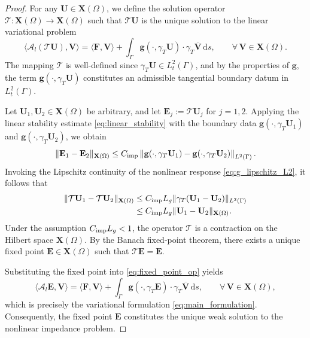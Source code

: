 \documentclass[12pt,reqno]{amsart}
\theoremstyle{definition}
\numberwithin{equation}{section}
\begin{document}
\begin{proof}
For any $\mathbf{U} \in \mathbf{X}(\Omega)$, we define the solution operator $\mathcal{T} \colon \mathbf{X}(\Omega) \to \mathbf{X}(\Omega)$ such that $\mathcal{T}\mathbf{U}$ is the unique solution to the linear variational problem
\begin{equation}\label{eq:fixed_point_op}
\langle \mathscr {A}_l (\mathcal{T}\mathbf{U}), \mathbf{V} \rangle = \langle \mathbf{F}, \mathbf{V} \rangle + \int_\Gamma \mathbf{g}(\cdot, \gamma_T \mathbf{U}) \cdot \gamma_T \overline{\mathbf{V}} \, \mathrm{d}s, \qquad \forall \, \mathbf{V} \in \mathbf{X}(\Omega).
\end{equation}
The mapping $\mathcal{T}$ is well-defined since $\gamma_T \mathbf{U} \in L_t^2(\Gamma)$, and by the properties of $\mathbf{g}$, the term $\mathbf{g}(\cdot, \gamma_T \mathbf{U})$ constitutes an admissible tangential boundary datum in $L_t^2(\Gamma)$.

Let $\mathbf{U}_1, \mathbf{U}_2 \in \mathbf{X}(\Omega)$ be arbitrary, and let $\mathbf{E}_j := \mathcal{T}\mathbf{U}_j$ for $j=1,2$. Applying the linear stability estimate \eqref{eq:linear_stability} with the boundary data $\mathbf{g}(\cdot, \gamma_T \mathbf{U}_1)$ and $\mathbf{g}(\cdot, \gamma_T \mathbf{U}_2)$, we obtain
\[
\|\mathbf{E}_1 - \mathbf{E}_2\|_{\mathbf{X}(\Omega)} \le C_{\rm imp} \left\| \mathbf{g}(\cdot, \gamma_T \mathbf{U}_1) - \mathbf{g}(\cdot, \gamma_T \mathbf{U}_2) \right\|_{L^2(\Gamma)}.
\]
Invoking the Lipschitz continuity of the nonlinear response \eqref{eq:g_lipschitz_L2}, it follows that
\[
\begin{aligned}
\|\mathcal{T}\mathbf{U}_1 - \mathcal{T}\mathbf{U}_2\|_{\mathbf{X}(\Omega)} &\le C_{\rm imp} L_g \|\gamma_T(\mathbf{U}_1 - \mathbf{U}_2)\|_{L^2(\Gamma)} \\
&\le C_{\rm imp} L_g \|\mathbf{U}_1 - \mathbf{U}_2\|_{\mathbf{X}(\Omega)}.
\end{aligned}
\]
Under the assumption $C_{\rm imp} L_g < 1$, the operator $\mathcal{T}$ is a contraction on the Hilbert space $\mathbf{X}(\Omega)$. By the Banach fixed-point theorem, there exists a unique fixed point $\mathbf{E} \in \mathbf{X}(\Omega)$ such that $\mathcal{T}\mathbf{E} = \mathbf{E}$.

Substituting the fixed point into \eqref{eq:fixed_point_op} yields
\[
\langle \mathscr {A}_l \mathbf{E}, \mathbf{V} \rangle = \langle \mathbf{F}, \mathbf{V} \rangle + \int_\Gamma \mathbf{g}(\cdot, \gamma_T \mathbf{E}) \cdot \gamma_T \overline{\mathbf{V}} \, \mathrm{d}s, \qquad \forall \, \mathbf{V} \in \mathbf{X}(\Omega),
\]
which is precisely the variational formulation \eqref{eq:main_formulation}. Consequently, the fixed point $\mathbf{E}$ constitutes the unique weak solution to the nonlinear impedance problem.
\end{proof}
\end{document}
